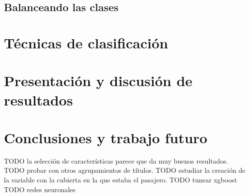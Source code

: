 \documentclass[10pt,a4paper]{article}
\begin{document}
\subsection{Balanceando las clases}

\section{Técnicas de clasificación}

\section{Presentación y discusión de resultados}

\section{Conclusiones y trabajo futuro}

TODO la selección de características parece que da muy buenos resultados.
TODO probar con otros agrupamientos de títulos.
TODO estudiar la creación de la variable con la cubierta en la que estaba el pasajero.
TODO tunear xgboost
TODO redes neuronales
\end{document}
